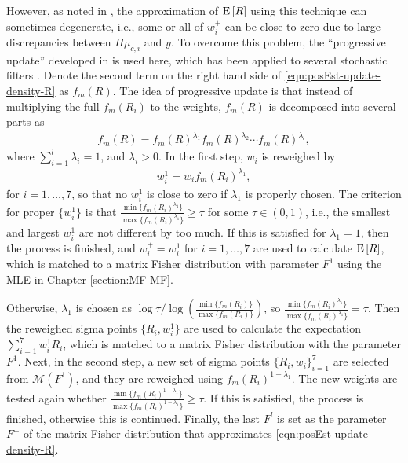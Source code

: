 However, as noted in \cite{kurz2016recursive}, the approximation of $\mathrm{E}\left[ R \right]$ using this technique can sometimes degenerate, i.e., some or all of $w_i^+$ can be close to zero due to large discrepancies between $H\mu_{c,i}$ and $y$.
To overcome this problem, the ``progressive update'' developed in \cite{hanebeck2013pgf} is used here, which has been applied to several stochastic filters \cite{huang2015gaussian,kurz2014nonlinear,li2021progressive}.
Denote the second term on the right hand side of \eqref{eqn:posEst-update-density-R} as $f_m(R)$.
The idea of progressive update is that instead of multiplying the full $f_m(R_i)$ to the weights, $f_m(R)$ is decomposed into several parts as
\begin{align*}
	f_m(R) = f_m(R)^{\lambda_1} f_m(R)^{\lambda_2} \cdots f_m(R)^{\lambda_l},
\end{align*}
where $\sum_{i=1}^l \lambda_i = 1$, and $\lambda_i>0$.
In the first step, $w_i$ is reweighed by
\begin{align*}
	w_i^1 = w_i f_m(R_i)^{\lambda_1},
\end{align*}
for $i=1,\ldots,7$, so that no $w_i^1$ is close to zero if $\lambda_1$ is properly chosen.
The criterion for proper $\{w_i^1\}$ is that $\tfrac{\min\{f_m(R_i)^{\lambda_1}\}}{\max\{f_m(R_i)^{\lambda_1}\}} \geq \tau$ for some $\tau \in (0,1)$, i.e., the smallest and largest $w_i^1$ are not different by too much.
If this is satisfied for $\lambda_1 = 1$, then the process is finished, and $w_i^+ = w_i^1$ for $i=1,\ldots,7$ are used to calculate $\mathrm{E}\left[ R \right]$, which is matched to a matrix Fisher distribution with parameter $F^1$ using the MLE in Chapter \ref{section:MF-MF}.

Otherwise, $\lambda_1$ is chosen as $\log\tau / \log\left( \tfrac{\min\{f_m(R_i)\}}{\max\{f_m(R_i)\}} \right)$, so $\tfrac{\min\{f_m(R_i)^{\lambda_1}\}}{\max\{f_m(R_i)^{\lambda_1}\}} = \tau$.
Then the reweighed sigma points $\{R_i, w_i^1\}$ are used to calculate the expectation $\sum_{i=1}^7 w_i^1 R_i$, which is matched to a matrix Fisher distribution with the parameter $F^1$.
Next, in the second step, a new set of sigma points $\{R_i,w_i\}_{i=1}^7$ are selected from $\mathcal{M}(F^1)$, and they are reweighed using $f_m(R_i)^{1-\lambda_1}$.
The new weights are tested again whether $\tfrac{\min\{f_m(R_i)^{1-\lambda_1}\}}{\max\{f_m(R_i)^{1-\lambda_1}\}} \geq \tau$.
If this is satisfied, the process is finished, otherwise this is continued.
Finally, the last $F^l$ is set as the parameter $F^+$ of the matrix Fisher distribution that approximates \eqref{eqn:posEst-update-density-R}.

